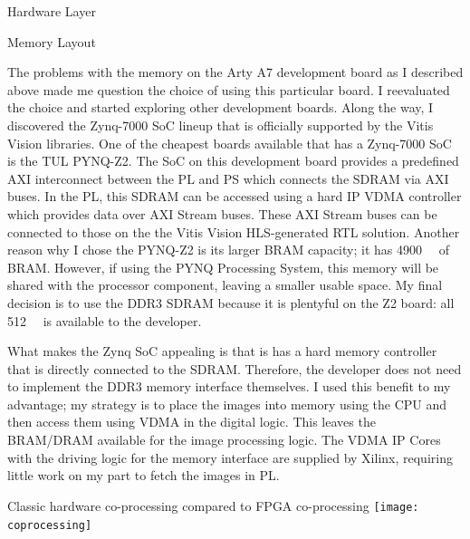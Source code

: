 \documentclass{matthijs}
\begin{document}
\begin{hoofdstuk}{Hardware Layer}
\begin{paragraaf}{Memory Layout}
			\bigskip

			The problems with the memory on the Arty A7 development board as I described above made me question the choice of using this particular board.
			I reevaluated the choice and started exploring other development boards.
			Along the way, I discovered the Zynq-7000 SoC lineup that is officially supported by the Vitis Vision libraries.
			One of the cheapest boards available that has a Zynq-7000 SoC is the TUL PYNQ-Z2.
			The SoC on this development board provides a predefined AXI interconnect between the PL and PS which connects the SDRAM via AXI buses.
			In the PL, this SDRAM can be accessed using a hard IP VDMA controller which provides data over AXI Stream buses.
			These AXI Stream buses can be connected to those on the the Vitis Vision HLS-generated RTL solution.
			Another reason why I chose the PYNQ-Z2 is its larger BRAM capacity; it has \qty{4900}{\kibi\bit} of BRAM.
			However, if using the PYNQ Processing System, this memory will be shared with the processor component, leaving a smaller usable space.
			My final decision is to use the DDR3 SDRAM because it is plentyful on the Z2 board: all \qty{512}{\mega\byte} is available to the developer.

			What makes the Zynq SoC appealing is that is has a hard memory controller that is directly connected to the SDRAM.
			Therefore, the developer does not need to implement the DDR3 memory interface themselves.
			I used this benefit to my advantage; my strategy is to place the images into memory using the CPU and then access them using VDMA in the digital logic.
			This leaves the BRAM/DRAM available for the image processing logic.
			The VDMA IP Cores with the driving logic for the memory interface are supplied by Xilinx, requiring little work on my part to fetch the images in PL.

			\vspace{-0.6ex}
			\begin{figuur}{Classic hardware co-processing compared to FPGA co-processing}
				\singlespacing
				\texttt{[image: coprocessing]}
				\onehalfspacing
				\vspace{-2ex}
			\end{figuur}
			\vspace{-0.2ex}


\end{paragraaf}
\end{hoofdstuk}
\end{document}
